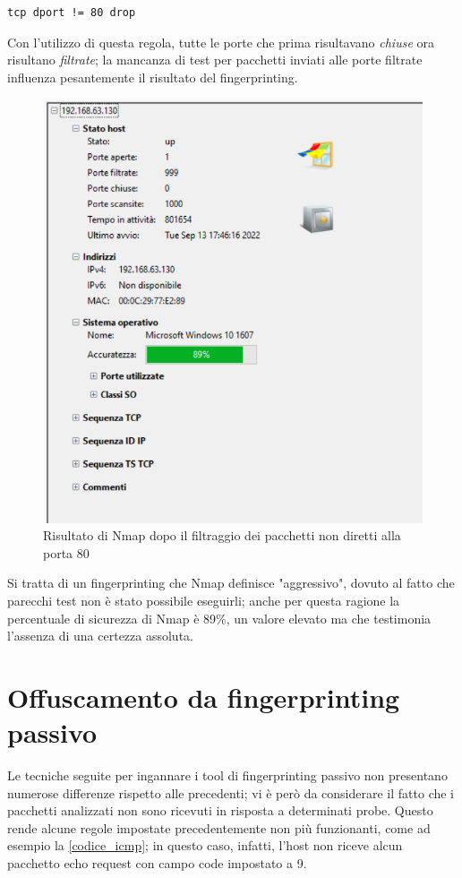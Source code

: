 \begin{lstlisting}[caption={Regola per il blocco di tutti i pacchetti ricevuti non diretti alla porta 80}]
	tcp dport != 80 drop
\end{lstlisting}

Con l'utilizzo di questa regola, tutte le porte che prima risultavano \textit{chiuse} ora risultano \textit{filtrate}; la mancanza di test per pacchetti inviati alle porte filtrate influenza pesantemente il risultato del fingerprinting.

\begin{figure}[H]
	\centering
	\includegraphics[scale=0.85]{figures/windows_nmap.png}
	\caption{Risultato di Nmap dopo il filtraggio dei pacchetti non diretti alla porta 80}
	\label{windows_nmap}
\end{figure}

Si tratta di un fingerprinting che Nmap definisce "aggressivo", dovuto al fatto che parecchi test non è stato possibile eseguirli; anche per questa ragione la percentuale di sicurezza di Nmap è 89\%, un valore elevato ma che testimonia l'assenza di una certezza assoluta.

\section{Offuscamento da fingerprinting passivo}
Le tecniche seguite per ingannare i tool di fingerprinting passivo non presentano numerose differenze rispetto alle precedenti; vi è però da considerare il fatto che i pacchetti analizzati non sono ricevuti in risposta a determinati probe.
Questo rende alcune regole impostate precedentemente non più funzionanti, come ad esempio la \ref{codice_icmp}; in questo caso, infatti, l'host non riceve alcun pacchetto echo request con campo code impostato a 9.





